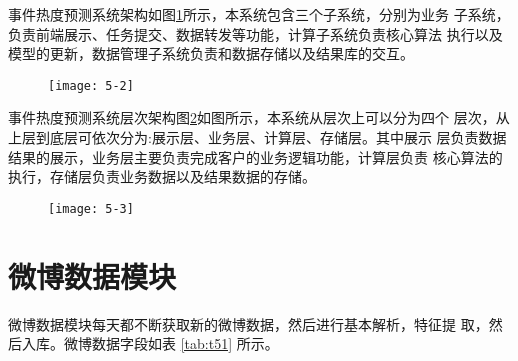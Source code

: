 事件热度预测系统架构如图\ref{fig:5_2}所示，本系统包含三个子系统，分别为业务 子系统，负责前端展示、任务提交、数据转发等功能，计算子系统负责核心算法 执行以及模型的更新，数据管理子系统负责和数据存储以及结果库的交互。

\begin{figure}[!htbp]
    \centering
    \texttt{[image: 5-2]}
    \label{fig:5_2}
\end{figure}

事件热度预测系统层次架构图\ref{fig:5_3}如图所示，本系统从层次上可以分为四个 层次，从上层到底层可依次分为:展示层、业务层、计算层、存储层。其中展示 层负责数据结果的展示，业务层主要负责完成客户的业务逻辑功能，计算层负责 核心算法的执行，存储层负责业务数据以及结果数据的存储。

\begin{figure}[!htbp]
    \centering
    \texttt{[image: 5-3]}
    \label{fig:5_3}
\end{figure}

\section{微博数据模块}


微博数据模块每天都不断获取新的微博数据，然后进行基本解析，特征提 取，然后入库。微博数据字段如表 \ref{tab:t51} 所示。

